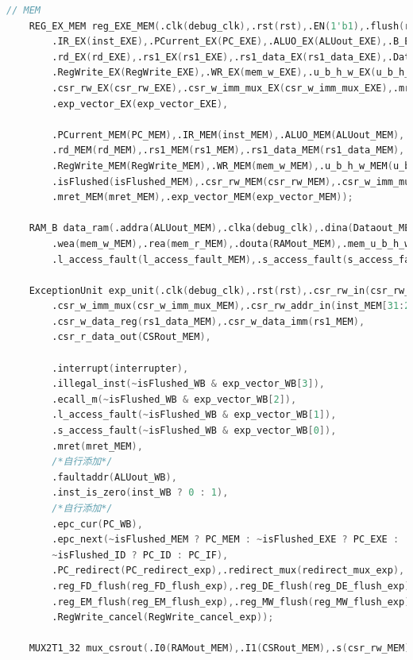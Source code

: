 \begin{lstlisting}[language = {verilog}]
    // MEM
    REG_EX_MEM reg_EXE_MEM(.clk(debug_clk),.rst(rst),.EN(1'b1),.flush(reg_EM_flush_exp | isFlushed_EXE),
        .IR_EX(inst_EXE),.PCurrent_EX(PC_EXE),.ALUO_EX(ALUout_EXE),.B_EX(Dataout_EXE),
        .rd_EX(rd_EXE),.rs1_EX(rs1_EXE),.rs1_data_EX(rs1_data_EXE),.DatatoReg_EX(DatatoReg_EXE),
        .RegWrite_EX(RegWrite_EXE),.WR_EX(mem_w_EXE),.u_b_h_w_EX(u_b_h_w_EXE),.mem_r_EX(mem_r_EXE),
        .csr_rw_EX(csr_rw_EXE),.csr_w_imm_mux_EX(csr_w_imm_mux_EXE),.mret_EX(mret_EXE),
        .exp_vector_EX(exp_vector_EXE),

        .PCurrent_MEM(PC_MEM),.IR_MEM(inst_MEM),.ALUO_MEM(ALUout_MEM),.Datao_MEM(Dataout_MEM),
        .rd_MEM(rd_MEM),.rs1_MEM(rs1_MEM),.rs1_data_MEM(rs1_data_MEM),.DatatoReg_MEM(DatatoReg_MEM),
        .RegWrite_MEM(RegWrite_MEM),.WR_MEM(mem_w_MEM),.u_b_h_w_MEM(u_b_h_w_MEM),.mem_r_MEM(mem_r_MEM),
        .isFlushed(isFlushed_MEM),.csr_rw_MEM(csr_rw_MEM),.csr_w_imm_mux_MEM(csr_w_imm_mux_MEM),
        .mret_MEM(mret_MEM),.exp_vector_MEM(exp_vector_MEM));
    
    RAM_B data_ram(.addra(ALUout_MEM),.clka(debug_clk),.dina(Dataout_MEM), 
        .wea(mem_w_MEM),.rea(mem_r_MEM),.douta(RAMout_MEM),.mem_u_b_h_w(u_b_h_w_MEM),
        .l_access_fault(l_access_fault_MEM),.s_access_fault(s_access_fault_MEM));

    ExceptionUnit exp_unit(.clk(debug_clk),.rst(rst),.csr_rw_in(csr_rw_MEM),.csr_wsc_mode_in(inst_MEM[13:12]),
        .csr_w_imm_mux(csr_w_imm_mux_MEM),.csr_rw_addr_in(inst_MEM[31:20]),
        .csr_w_data_reg(rs1_data_MEM),.csr_w_data_imm(rs1_MEM),
        .csr_r_data_out(CSRout_MEM),

        .interrupt(interrupter),
        .illegal_inst(~isFlushed_WB & exp_vector_WB[3]),
        .ecall_m(~isFlushed_WB & exp_vector_WB[2]),
        .l_access_fault(~isFlushed_WB & exp_vector_WB[1]),
        .s_access_fault(~isFlushed_WB & exp_vector_WB[0]),
        .mret(mret_MEM),
        /*自行添加*/
        .faultaddr(ALUout_WB),
        .inst_is_zero(inst_WB ? 0 : 1),
        /*自行添加*/    
        .epc_cur(PC_WB),
        .epc_next(~isFlushed_MEM ? PC_MEM : ~isFlushed_EXE ? PC_EXE :
        ~isFlushed_ID ? PC_ID : PC_IF),
        .PC_redirect(PC_redirect_exp),.redirect_mux(redirect_mux_exp),
        .reg_FD_flush(reg_FD_flush_exp),.reg_DE_flush(reg_DE_flush_exp),
        .reg_EM_flush(reg_EM_flush_exp),.reg_MW_flush(reg_MW_flush_exp),
        .RegWrite_cancel(RegWrite_cancel_exp));
    
    MUX2T1_32 mux_csrout(.I0(RAMout_MEM),.I1(CSRout_MEM),.s(csr_rw_MEM),.o(Datain_MEM));
        


\end{lstlisting}
